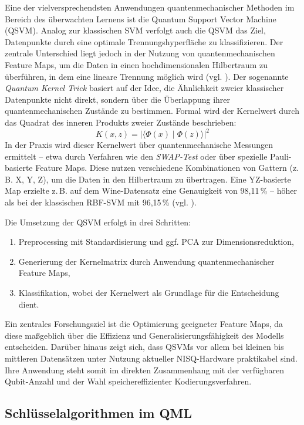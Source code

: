 Eine der vielversprechendsten Anwendungen quantenmechanischer Methoden im Bereich des überwachten Lernens ist die Quantum Support Vector Machine (QSVM). Analog zur klassischen SVM verfolgt auch die QSVM das Ziel, Datenpunkte durch eine optimale Trennungshyperfläche zu klassifizieren. Der zentrale Unterschied liegt jedoch in der Nutzung von quantenmechanischen Feature Maps, um die Daten in einen hochdimensionalen Hilbertraum zu überführen, in dem eine lineare Trennung möglich wird (vgl. \cite{kavithaQuantumMachineLearning2024}).
Der sogenannte \textit{Quantum Kernel Trick} basiert auf der Idee, die Ähnlichkeit zweier klassischer Datenpunkte nicht direkt, sondern über die Überlappung ihrer quantenmechanischen Zustände zu bestimmen. Formal wird der Kernelwert durch das Quadrat des inneren Produkts zweier Zustände beschrieben:
\[
K(x, z) = \left| \langle \Phi(x) \mid \Phi(z) \rangle \right|^2
\]
In der Praxis wird dieser Kernelwert über quantenmechanische Messungen ermittelt – etwa durch Verfahren wie den \textit{SWAP-Test} oder über spezielle Pauli-basierte Feature Maps. Diese nutzen verschiedene Kombinationen von Gattern (z.\,B. X, Y, Z), um die Daten in den Hilbertraum zu übertragen. Eine YZ-basierte Map erzielte z.\,B. auf dem Wine-Datensatz eine Genauigkeit von 98{,}11\,\% – höher als bei der klassischen RBF-SVM mit 96{,}15\,\%  (vgl. \cite{kavithaQuantumMachineLearning2024}).

Die Umsetzung der QSVM erfolgt in drei Schritten:  
\begin{enumerate}
  \item Preprocessing mit Standardisierung und ggf. PCA zur Dimensionsreduktion,
  \item Generierung der Kernelmatrix durch Anwendung quantenmechanischer Feature Maps,
  \item Klassifikation, wobei der Kernelwert als Grundlage für die Entscheidung dient.
\end{enumerate}  
Ein zentrales Forschungsziel ist die Optimierung geeigneter Feature Maps, da diese maßgeblich über die Effizienz und Generalisierungsfähigkeit des Modells entscheiden. Darüber hinaus zeigt sich, dass QSVMs vor allem bei kleinen bis mittleren Datensätzen unter Nutzung aktueller NISQ-Hardware praktikabel sind. Ihre Anwendung steht somit im direkten Zusammenhang mit der verfügbaren Qubit-Anzahl und der Wahl speichereffizienter Kodierungsverfahren.  


\subsection{Schlüsselalgorithmen im QML}

